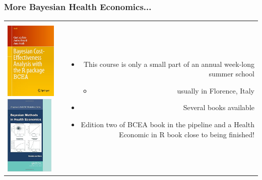\begin{frame}%
\frametitle{More Bayesian Health Economics...}

\begin{tabular}{lcr}
\begin{minipage}[l]{5.0cm}
\textbf{Books}\\
\includegraphics[height=3.8cm]{bcea_book}
\includegraphics[height=3.8cm]{bmhe_book}
\end{minipage} & &
\begin{minipage}[r]{6.5cm}
\begin{itemize}
\item This course is only a small part of an \alert{annual week-long summer school}
\begin{itemize}
\item usually in Florence, Italy
\end{itemize}
\item Several books available
\item Edition two of BCEA book in the pipeline and a Health Economic in R book close to being finished!
\end{itemize}

\end{minipage}
\end{tabular}
\end{frame}

